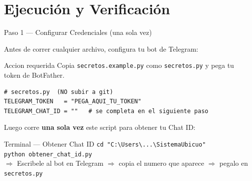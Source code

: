 \documentclass[aspectratio=169]{beamer}
\begin{document}
\section{Ejecuci\'on y Verificaci\'on}

\begin{frame}[fragile]{Paso 1 --- Configurar Credenciales (una sola vez)}

Antes de correr cualquier archivo, configura tu bot de Telegram:

\vspace{0.4em}
\begin{alertblock}{Accion requerida}
Copia \texttt{secretos.example.py} como \texttt{secretos.py} y pega tu token de BotFather.
\end{alertblock}

\vspace{0.4em}
\begin{lstlisting}
# secretos.py  (NO subir a git)
TELEGRAM_TOKEN   = "PEGA_AQUI_TU_TOKEN"
TELEGRAM_CHAT_ID = ""   # se completa en el siguiente paso
\end{lstlisting}

\vspace{0.4em}
Luego corre \textbf{una sola vez} este script para obtener tu Chat ID:

\begin{block}{Terminal --- Obtener Chat ID}
\texttt{cd "C:\textbackslash{}Users\textbackslash{}...\textbackslash{}SistemaUbicuo"}\\
\texttt{python obtener\_chat\_id.py}\\
{\small $\Rightarrow$ Escribele al bot en Telegram $\Rightarrow$ copia el numero que aparece $\Rightarrow$ pegalo en \texttt{secretos.py}}
\end{block}
\end{frame}
\end{document}
